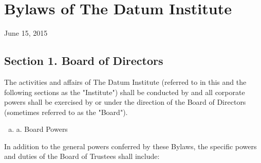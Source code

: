 \section{Bylaws of The Datum Institute}

June 15, 2015

\subsection{Section 1. Board of Directors}

The activities and affairs of The Datum Institute (referred to in this and the following sections as the "Institute") shall be conducted by and all corporate powers shall be exercised by or under the direction of the Board of Directors (sometimes referred to as the "Board"). 

\begin{enumerate}[(a)]
\item a. Board Powers
\end{enumerate}

In addition to the general powers conferred by these Bylaws, the specific powers and duties of the Board of Trustees shall include:

